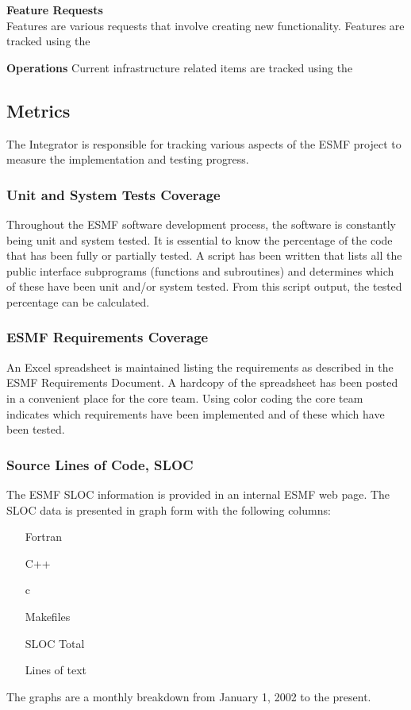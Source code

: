 {\bf Feature Requests}\\

Features are various requests that involve creating new functionality. Features are tracked using the 

{\bf Operations}
Current infrastructure related items are tracked using the

\subsection{Metrics}

The Integrator is responsible for tracking various aspects of the
ESMF project to measure the implementation and testing progress.
\subsubsection{Unit and System Tests Coverage}
Throughout the ESMF software development process, the software is constantly
being unit and system tested. It is essential to know the percentage of the
code that has been fully or partially tested. A script has been written that 
lists all the public interface subprograms (functions and subroutines) and 
determines which of these have been unit and/or system tested. From this script
output, the tested percentage can be calculated.
\subsubsection{ESMF Requirements Coverage}
An Excel spreadsheet is maintained listing the requirements as described in the
ESMF Requirements Document. A hardcopy of the spreadsheet has been posted in a
convenient place for the core team. Using color coding the core team indicates
which requirements have been implemented and of these which have been tested.
\subsubsection{Source Lines of Code, SLOC}
The ESMF SLOC information is provided in an internal ESMF web page. The
SLOC data is presented in graph form with the following columns:
\begin{enumerate}
\item[Fortran] 
\item[C++] 
\item[c] 
\item[Makefiles] 
\item[SLOC Total] 
\item[Lines of text] 
\end{enumerate}

The graphs are a monthly breakdown from January 1, 2002 to the present.
























